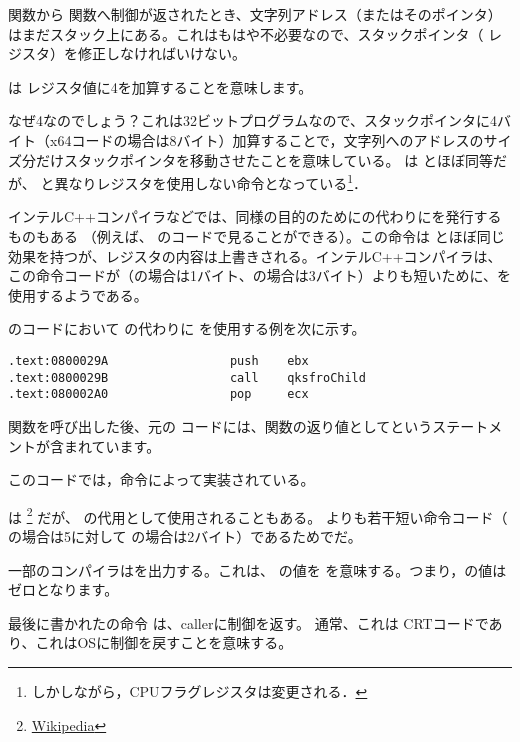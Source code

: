 \printf 関数から \main 関数へ制御が返されたとき、文字列アドレス（またはそのポインタ）はまだスタック上にある。これはもはや不必要なので、スタックポインタ（ \ESP レジスタ）を修正しなければいけない。

は \ESP レジスタ値に4を加算することを意味します。

なぜ4なのでしょう？これは32ビットプログラムなので、スタックポインタに4バイト（x64コードの場合は8バイト）加算することで，文字列へのアドレスのサイズ分だけスタックポインタを移動させたことを意味している。
 は  とほぼ同等だが、  と異なりレジスタを使用しない命令となっている\footnote{しかしながら，CPUフラグレジスタは変更される．}．

\myindex{\oracle}

インテルC++コンパイラなどでは、同様の目的のために\ADD の代わりにを発行するものもある
（例えば、\oracle{} のコードで見ることができる）。この命令は \ADD とほぼ同じ効果を持つが、\ECX レジスタの内容は上書きされる。インテルC++コンパイラは、この命令コードが（の場合は1バイト、の場合は3バイト）よりも短いために、を使用するようである。

\oracle{} のコードにおいて \ADD の代わりに \POP を使用する例を次に示す。

\begin{lstlisting}[caption=\oracle 10.2 Linux (app.o file),style=customasmx86]
.text:0800029A                 push    ebx
.text:0800029B                 call    qksfroChild
.text:080002A0                 pop     ecx
\end{lstlisting}

\printf 関数を呼び出した後、元の \CCpp コードには、\main 関数の返り値としてというステートメントが含まれています。

このコードでは，命令によって実装されている。


\XOR は \footnote{\href{http://go.yurichev.com/17118}{Wikipedia}} だが、 の代用として使用されることもある。 \MOV よりも若干短い命令コード（ \MOV の場合は5に対して \XOR の場合は2バイト）であるためでだ。

一部のコンパイラはを出力する。これは、 \EAX の値を \EAX {} を意味する。つまり，\EAX の値はゼロとなります。

最後に書かれたの命令 \RET は、\gls{caller}に制御を返す。 通常、これは \CCpp \ac{CRT}コードであり、これは\ac{OS}に制御を戻すことを意味する。
